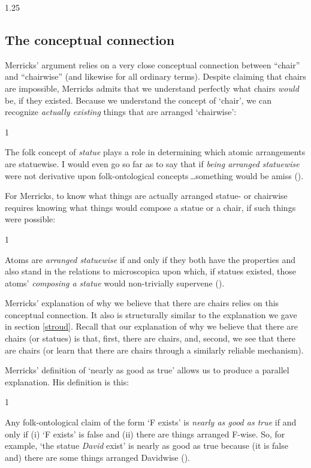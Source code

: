 \documentclass[11pt]{article}
\newenvironment{squote}{%
\begin{spacing}{1}
       	\begin{list}{}{%
\setlength{\labelwidth}{0pt}%
\rightmargin\leftmargin%
}
\item\relax
}{%
\end{list}%
\end{spacing}
}
\begin{document}
\begin{spacing}{1.25}
\subsection{The conceptual connection}
\label{connection}
Merricks' argument relies on a very close conceptual connection
between ``chair'' and ``chairwise'' (and likewise for all ordinary
terms).  Despite claiming that chairs are impossible, Merricks admits
that we understand perfectly what chairs {\em would} be, if they
existed.  Because we understand the concept of `chair', we can
recognize {\em actually existing} things that are arranged
`chairwise':

\begin{squote}
The folk concept of \emph{statue} plays a role in determining which
atomic arrangements are statuewise. I would even go so far as to say
that if \emph{being arranged statuewise} were not derivative upon
folk-ontological concepts\,\ldots something would be amiss
(\citeyear[8]{merricks2001a}).
\end{squote}

For Merricks, to know what things are actually arranged statue- or
chairwise requires knowing what things would compose a statue or a
chair, if such things were possible:

\begin{squote}
Atoms are \emph{arranged statuewise} if and only if they both have the
properties and also stand in the relations to microscopica upon which,
if statues existed, those atoms' \emph{composing a statue} would
non-trivially supervene (\citeyear[4]{merricks2001a}).
\end{squote}

Merricks' explanation of why we believe that there are chairs relies
on this conceptual connection.  It also is structurally similar to the
explanation we gave in section \ref{stroud}.  Recall that our
explanation of why we believe that there are chairs (or statues) is
that, first, there are chairs, and, second, we see that there are
chairs (or learn that there are chairs through a similarly reliable
mechanism).

Merricks' definition of `nearly as good as true' allows us to produce
a parallel explanation.  His definition is this:

\begin{squote}
Any folk-ontological claim of the form `F exists' is \emph{nearly as
  good as true} if and only if (i) `F exists' is false and (ii) there
are things arranged F-wise. So, for example, `the statue \emph{David}
exist' is nearly as good as true because (it is false and) there are
some things arranged Davidwise (\citeyear[171]{merricks2001a}).
\end{squote}


\end{spacing}
\end{document}
